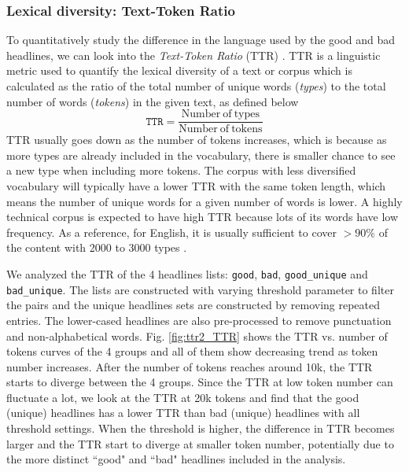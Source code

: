 \documentclass[%
preprint,
 amsmath,amssymb,
 aps,
]{revtex4-2}
\begin{document}
\subsubsection{Lexical diversity: Text-Token Ratio}

To quantitatively study the difference in the language used by the good and bad headlines, we can look into the \textit{Text-Token Ratio} (TTR) \cite{jurafskyspeech}.
TTR is a linguistic metric used to quantify the lexical diversity of a text or corpus which is calculated as the ratio of the total number of unique words (\textit{types}) to the total number of words (\textit{tokens}) in the given text, as defined below
\begin{equation}
    \texttt{TTR} = \frac{\mathrm{Number\ of\ types}}{\mathrm{Number\ of\ tokens}}
\end{equation}
TTR usually goes down as the number of tokens increases, which is because as more types are already included in the vocabulary, there is smaller chance to see a new type when including more tokens.
The corpus with less diversified vocabulary will typically have a lower TTR with the same token length, which means the number of unique words for a given number of words is lower.
A highly technical corpus is expected to have high TTR because lots of its words have low frequency.
As a reference, for English, it is usually sufficient to cover \(>90\%\) of the content with 2000 to 3000 types \cite{nagy1984many}.

We analyzed the TTR of the 4 headlines lists: \texttt{good}, \texttt{bad}, \texttt{good\_unique} and \texttt{bad\_unique}.
The lists are constructed with varying threshold parameter to filter the pairs and the unique headlines sets are constructed by removing repeated entries.
The lower-cased headlines are also pre-processed to remove punctuation and non-alphabetical words.
Fig. \ref{fig:ttr2_TTR} shows the TTR vs. number of tokens curves of the 4 groups and all of them show decreasing trend as token number increases. 
After the number of tokens reaches around 10k, the TTR starts to diverge between the 4 groups.
Since the TTR at low token number can fluctuate a lot, we look at the TTR at 20k tokens and find that the good (unique) headlines has a lower TTR than bad (unique) headlines with all threshold settings.
When the threshold is higher, the difference in TTR becomes larger and the TTR start to diverge at smaller token number, potentially due to the more distinct ``good" and ``bad" headlines included in the analysis.
\end{document}
